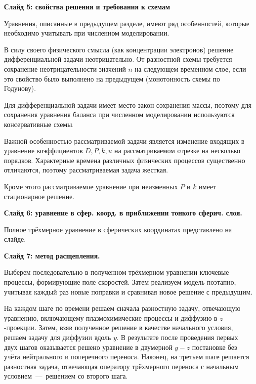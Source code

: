 \documentclass[2pt, a4paper, fleqn]{extarticle}
\begin{document}
\medskip

{\bf Слайд 5: свойства решения и требования к схемам}

Уравнения, описанные в предыдущем разделе, имеют ряд особенностей, которые необходимо учитывать при численном моделировании.

В силу своего физического смысла (как концентрации электронов) решение дифференциальной задачи неотрицательно. От разностной схемы требуется сохранение неотрицательности значений $n$ на следующем временном слое, если это свойство было выполнено на предыдущем (монотонность схемы по Годунову). 

Для дифференциальной задачи имеет место закон сохранения массы, поэтому для сохранения уравнения баланса при численном моделировании используются консервативные схемы.

Важной особенностью рассматриваемой задачи является изменение входящих в уравнение коэффициентов $D, P, k, u$ на рассматриваемом отрезке на несколько порядков. 
Характерные времена различных физических процессов существенно отличаются, поэтому рассматриваемая задача жесткая.

Кроме этого рассматриваемое уравнение при неизменных $P$ и $k$ имеет стационарное решение.

\medskip

{\bf Слайд 6: уравнение в сфер. коорд. в приближении тонкого сферич. слоя.}

Полное трёхмерное уравнение в сферических координатах представлено на слайде.

\medskip

{\bf Слайд 7: метод расщепления.}

Выберем последовательно в полученном трёхмерном уравнении ключевые процессы, формирующие поле скоростей. Затем реализуем модель поэтапно, учитывая каждый раз новые поправки и сравнивая новое решение с предыдущим.

На каждом шаге по времени решаем сначала разностную задачу, отвечающую уравнению, включающему плазмохимические процессы и диффузию в $z$-проекции. Затем, взяв полученное решение в качестве начального условия, решаем задачу для диффузии вдоль $y$. В результате после проведения первых двух шагов оказывается решено уравнение в двумерной $y-z$ постановке без учёта нейтрального и поперечного переноса. Наконец, на третьем шаге решается разностная задача, отвечающая оператору трёхмерного переноса с начальным условием~---~решением со второго шага. 


\medskip
\end{document}
